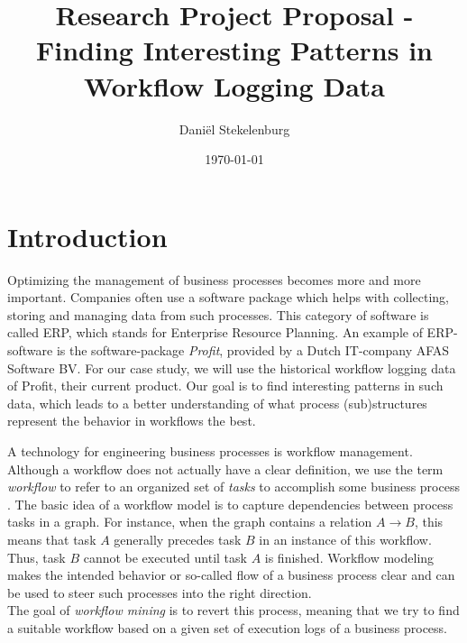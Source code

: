 \documentclass[a4paper,11pt]{article}
\begin{document}
\theoremstyle{plain}
\newtheorem{thm}{Theorem}{}

\theoremstyle{definition}
\newtheorem{defn}[thm]{Definition}

\renewcommand{\vec}[1]{\mathbf{#1}}

\title{Research Project Proposal - Finding Interesting Patterns in Workflow Logging Data}
\date{\today}
\author{
        Dani\"el Stekelenburg		
}
 
\maketitle

\abstract{}

\section{Introduction}
Optimizing the management of business processes becomes more and more important. Companies often use a software package which helps with collecting, storing and managing data from such processes. This category of software is called ERP, which stands for Enterprise Resource Planning. An example of ERP-software is the software-package \textit{Profit}, provided by a Dutch IT-company AFAS Software BV. For our case study, we will use the historical workflow logging data of Profit, their current product. Our goal is to find interesting patterns in such data, which leads to a better understanding of what process (sub)structures represent the behavior in workflows the best.

A technology for engineering business processes is workflow management. Although a workflow does not actually have a clear definition, we use the term \textit{workflow} to refer to an organized set of \textit{tasks} to accomplish some business process \cite{Georgakopoulos1995}. The basic idea of a workflow model is to capture dependencies between process tasks in a graph. For instance, when the graph contains a relation $A \rightarrow B$, this means that task $A$ generally precedes task $B$ in an instance of this workflow. Thus, task $B$ cannot be executed until task $A$ is finished. Workflow modeling makes the intended behavior or so-called flow of a business process clear and can be used to steer such processes into the right direction.\\
The goal of \textit{workflow mining} is to revert this process, meaning that we try to find a suitable workflow based on a given set of execution logs of a business process.
\end{document}
